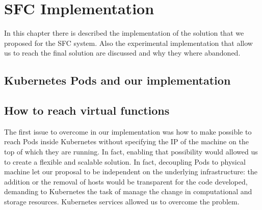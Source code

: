 \chapter{SFC Implementation}
\label{chap:impl}

\newcommand{\enchainer}{\texttt{Enchainer}}
\newcommand{\vnf}{\texttt{VNF}}
\newcommand{\vnfs}{\texttt{VNFs}}
\newcommand{\dispatcher}{\texttt{Dispatcher}}
\newcommand{\astaire}{\texttt{Astaire}}
\newcommand{\ironhide}{\texttt{Ironhide}}
\newcommand{\harbor}{\texttt{Harbor}}
\newcommand{\roulette}{\texttt{Roulette}}
\newcommand{\ingress}{\texttt{ingress}}
\newcommand{\ingresses}{\texttt{ingresses}}
\newcommand{\egress}{\texttt{egress}}
\newcommand{\egresses}{\texttt{egresses}}

In this chapter there is described the implementation of the solution that we
proposed for the SFC system. Also the experimental implementation that allow us
to reach the final solution are discussed and why they where abandoned.

\section{Kubernetes Pods and our implementation}

\section{How to reach virtual functions}
The first issue to overcome in our implementation was how to make possible to
reach Pods inside Kubernetes without specifying the IP of the machine on the top
of which they are running. In fact, enabling that possibility would allowed us
to create a flexible and scalable solution. In fact, decoupling Pods to physical
machine let our proposal to be independent on the underlying infrastructure: the
addition or the removal of hosts would be transparent for the code developed,
demanding to Kubernetes the task of manage the change in computational and
storage resources. Kubernetes services  allowed us to
overcome the problem. 

